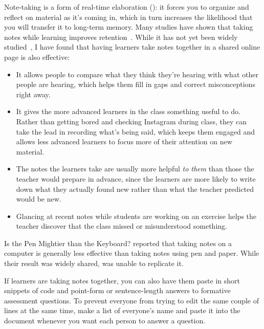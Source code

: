 
Note-taking is a form of real-time elaboration ():
it forces you to organize and reflect on material as it's coming in,
which in turn increases the likelihood that you will transfer it to long-term memory.
Many studies have shown that
taking notes while learning improves retention~\cite{Aike1975,Boha2011}.
While it has not yet been widely studied~\cite{Ornd2015,Yang2015},
I have found that having learners take notes together in a shared online page is also effective:

\begin{itemize}

\item
  It allows people to compare what they think they're hearing
  with what other people are hearing,
  which helps them fill in gaps and correct misconceptions right away.

\item
  It gives the more advanced learners in the class something useful to do.
  Rather than getting bored and checking Instagram during class,
  they can take the lead in recording what's being said,
  which keeps them engaged
  and allows less advanced learners to focus more of their attention on new material.

\item
  The notes the learners take are usually more helpful \emph{to them}
  than those the teacher would prepare in advance,
  since the learners are more likely to write down what they actually found new
  rather than what the teacher predicted would be new.

\item
  Glancing at recent notes while students are working on an exercise
  helps the teacher discover that the class missed or misunderstood something.

\end{itemize}

\begin{aside}{Is the Pen Mightier than the Keyboard?}
  \cite{Muel2014} reported that taking notes on a computer
  is generally less effective than taking notes using pen and paper.
  While their result was widely shared,
  \cite{More2019} was unable to replicate it.
\end{aside}

If learners are taking notes together,
you can also have them paste in short snippets of code
and point-form or sentence-length answers to formative assessment questions.
To prevent everyone from trying to edit the same couple of lines at the same time,
make a list of everyone's name and paste it into the document
whenever you want each person to answer a question.

